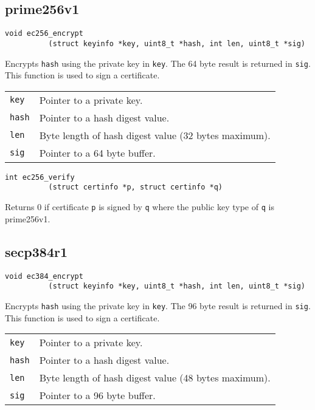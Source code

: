 \documentclass[12pt]{article}
\begin{document}
\subsection{prime256v1}

\bigskip
\bigskip
\begin{verbatim}
void ec256_encrypt
          (struct keyinfo *key, uint8_t *hash, int len, uint8_t *sig)
\end{verbatim}

\noindent
Encrypts {\tt hash} using the private key in {\tt key}.
The 64 byte result is returned in {\tt sig}.
This function is used to sign a certificate.

\bigskip
\begin{tabular}{ll}
{\tt key} & Pointer to a private key.\\
{\tt hash} & Pointer to a hash digest value.\\
{\tt len} & Byte length of hash digest value (32 bytes maximum).\\
{\tt sig} & Pointer to a 64 byte buffer.
\end{tabular}

\bigskip
\bigskip
\begin{verbatim}
int ec256_verify
          (struct certinfo *p, struct certinfo *q)
\end{verbatim}

\noindent
Returns 0 if certificate {\tt p} is signed by {\tt q}
where the public key type of {\tt q} is prime256v1.

\bigskip
\subsection{secp384r1}

\bigskip
\bigskip
\begin{verbatim}
void ec384_encrypt
          (struct keyinfo *key, uint8_t *hash, int len, uint8_t *sig)
\end{verbatim}

\noindent
Encrypts {\tt hash} using the private key in {\tt key}.
The 96 byte result is returned in {\tt sig}.
This function is used to sign a certificate.

\bigskip
\begin{tabular}{ll}
{\tt key} & Pointer to a private key.\\
{\tt hash} & Pointer to a hash digest value.\\
{\tt len} & Byte length of hash digest value (48 bytes maximum).\\
{\tt sig} & Pointer to a 96 byte buffer.
\end{tabular}
\end{document}
